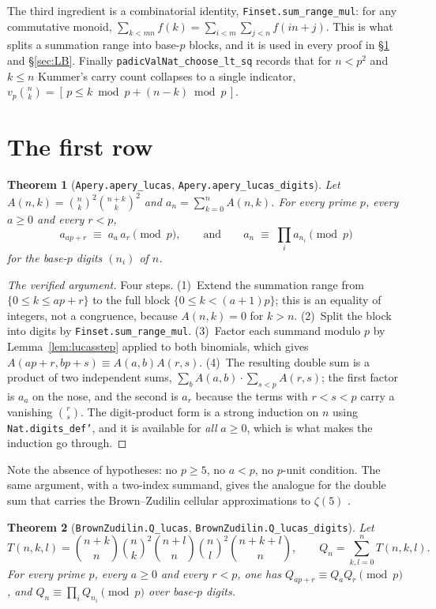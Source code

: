 \documentclass[11pt,reqno]{amsart}
\theoremstyle{plain}
\newtheorem{theorem}{Theorem}[section]
\theoremstyle{definition}
\theoremstyle{remark}
\newcommand{\vp}{v_p}
\newcommand{\bin}[2]{\binom{#1}{#2}}
\newcommand{\Ln}[1]{\texttt{#1}}
\numberwithin{equation}{section}
\begin{document}
The third ingredient is a combinatorial identity, \Ln{Finset.sum\_range\_mul}: for any
commutative monoid,
$\sum_{k<mn}f(k)=\sum_{i<m}\sum_{j<n}f(in+j)$. This is what splits a summation range into
base-$p$ blocks, and it is used in every proof in \S\ref{sec:firstrow} and \S\ref{sec:LB}.
Finally \Ln{padicValNat\_choose\_lt\_sq} records that for $n<p^2$ and $k\le n$ Kummer's
carry count collapses to a single indicator,
$\vp\bin nk=[\,p\le k\bmod p+(n-k)\bmod p\,]$.

\section{The first row}
\label{sec:firstrow}

\begin{theorem}[\Ln{Apery.apery\_lucas}, \Ln{Apery.apery\_lucas\_digits}]\label{thm:apery}
Let $A(n,k)=\bin nk^2\bin{n+k}k^2$ and $a_n=\sum_{k=0}^nA(n,k)$. For every prime $p$, every
$a\ge0$ and every $r<p$,
\[
   a_{ap+r}\;\equiv\;a_a\,a_r\pmod p,
   \qquad\text{and}\qquad
   a_n\;\equiv\;\prod_{i}a_{n_i}\pmod p
\]
for the base-$p$ digits $(n_i)$ of $n$.
\end{theorem}

\begin{proof}[The verified argument]
Four steps. (1)~Extend the summation range from $\{0\le k\le ap+r\}$ to the full block
$\{0\le k<(a+1)p\}$; this is an equality of integers, not a congruence, because
$A(n,k)=0$ for $k>n$. (2)~Split the block into digits by \Ln{Finset.sum\_range\_mul}.
(3)~Factor each summand modulo $p$ by Lemma~\ref{lem:lucasstep} applied to both binomials,
which gives $A(ap+r,bp+s)\equiv A(a,b)A(r,s)$. (4)~The resulting double sum is a product of
two independent sums, $\sum_b A(a,b)\cdot\sum_{s<p}A(r,s)$; the first factor is $a_a$ on the
nose, and the second is $a_r$ because the terms with $r<s<p$ carry a vanishing $\bin rs$.
The digit-product form is a strong induction on $n$ using \Ln{Nat.digits\_def'}, and it is
available for \emph{all} $a\ge0$, which is what makes the induction go through.
\end{proof}

Note the absence of hypotheses: no $p\ge5$, no $a<p$, no $p$-unit condition. The same
argument, with a two-index summand, gives the analogue for the double sum that carries the
Brown--Zudilin cellular approximations to $\zeta(5)$ \cite{BZ}.

\begin{theorem}[\Ln{BrownZudilin.Q\_lucas}, \Ln{BrownZudilin.Q\_lucas\_digits}]\label{thm:Q}
Let
\[
   T(n,k,l)=\bin{n+k}n\bin nk^2\bin{n+l}n\bin nl^2\bin{n+k+l}n,
   \qquad
   Q_n=\sum_{k,l=0}^{n}T(n,k,l).
\]
For every prime $p$, every $a\ge0$ and every $r<p$, one has
$Q_{ap+r}\equiv Q_aQ_r\pmod p$, and $Q_n\equiv\prod_iQ_{n_i}\pmod p$ over base-$p$ digits.
\end{theorem}
\end{document}
